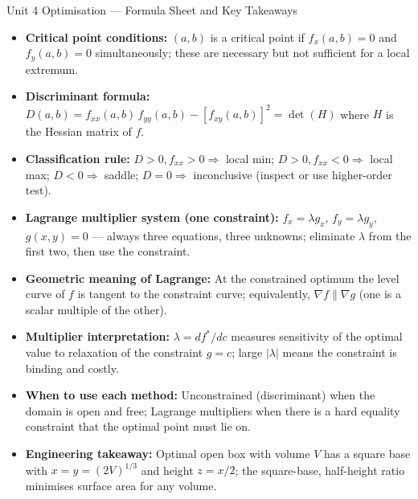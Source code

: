 \documentclass[12pt,a4paper]{article}
\begin{document}
\begin{learnbox}{Unit 4 Optimisation --- Formula Sheet and Key Takeaways}
\begin{itemize}
  \item \textbf{Critical point conditions:} $(a,b)$ is a critical point if $f_x(a,b)=0$ and $f_y(a,b)=0$ simultaneously; these are necessary but not sufficient for a local extremum.
  \item \textbf{Discriminant formula:} $D(a,b) = f_{xx}(a,b)\,f_{yy}(a,b) - [f_{xy}(a,b)]^{2} = \det(H)$ where $H$ is the Hessian matrix of $f$.
  \item \textbf{Classification rule:} $D > 0, f_{xx} > 0 \Rightarrow$ local min; $D > 0, f_{xx} < 0 \Rightarrow$ local max; $D < 0 \Rightarrow$ saddle; $D = 0 \Rightarrow$ inconclusive (inspect or use higher-order test).
  \item \textbf{Lagrange multiplier system (one constraint):} $f_x = \lambda g_x$, $f_y = \lambda g_y$, $g(x,y) = 0$ --- always three equations, three unknowns; eliminate $\lambda$ from the first two, then use the constraint.
  \item \textbf{Geometric meaning of Lagrange:} At the constrained optimum the level curve of $f$ is tangent to the constraint curve; equivalently, $\nabla f \parallel \nabla g$ (one is a scalar multiple of the other).
  \item \textbf{Multiplier interpretation:} $\lambda = df^*/dc$ measures sensitivity of the optimal value to relaxation of the constraint $g = c$; large $|\lambda|$ means the constraint is binding and costly.
  \item \textbf{When to use each method:} Unconstrained (discriminant) when the domain is open and free; Lagrange multipliers when there is a hard equality constraint that the optimal point must lie on.
  \item \textbf{Engineering takeaway:} Optimal open box with volume $V$ has a square base with $x = y = (2V)^{1/3}$ and height $z = x/2$; the square-base, half-height ratio minimises surface area for any volume.
\end{itemize}
\end{learnbox}
\end{document}
